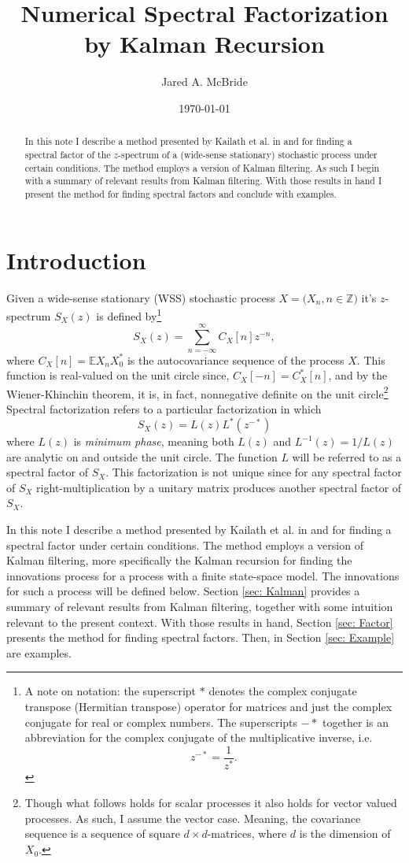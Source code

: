 \documentclass[12pt]{amsart}
\title{Numerical Spectral Factorization by Kalman Recursion}
\author{Jared A. McBride}
\date{\today}
\newcommand{\E}{\mathbb{E}}
\newcommand{\Z}{\mathbb{Z}}
\begin{document}
	
\begin{abstract}
	In this note I describe a method presented by Kailath et al. in \cite{sayed2001} and \cite{kailath2000} for finding a spectral factor of the $z$-spectrum of a (wide-sense stationary) stochastic process under certain conditions. The method employs a version of Kalman filtering. As such I begin with a summary of relevant results from Kalman filtering. With those results in hand I present the method for finding spectral factors and conclude with examples.
\end{abstract}

\maketitle
\tableofcontents

\section{Introduction}

Given a wide-sense stationary (WSS) stochastic process $X = \big(X_n, n \in \Z\big)$ it's $z$-spectrum $S_X(z)$ is defined by\footnote{
	A note on notation: the superscript $*$ denotes the complex conjugate transpose (Hermitian transpose) operator for matrices and just the complex conjugate for real or complex numbers. The superscripts $-*$ together is an abbreviation for the complex conjugate of the multiplicative inverse, i.e. $$z^{-*} = \frac{1}{z^*}.$$
	} 
$$S_X(z) = \sum_{n=-\infty}^\infty C_X[n]z^{-n},$$
where $C_X[n] = \E X_nX_0^*$ is the autocovariance sequence of the process $X$. This function is real-valued on the unit circle since, $C_X[-n] = C_X^*[n]$, and by the Wiener-Khinchin theorem, it is, in fact, nonnegative definite on the unit circle\footnote{
	Though what follows holds for scalar processes it also holds for vector valued processes. As such, I assume the vector case. Meaning, the covariance sequence is a sequence of square $d\times d$-matrices, where $d$ is the dimension of $X_0$.}
Spectral factorization refers to a particular factorization in which 
$$S_X(z) = L(z)L^*(z^{-*})$$
where $L(z)$ is \emph{minimum phase}, meaning both $L(z)$ and $L^{-1}(z) = 1/L(z)$ are analytic on and outside the unit circle. The function $L$ will be referred to as a spectral factor of $S_X$. This factorization is not unique since for any spectral factor of $S_X$ right-multiplication by a unitary matrix produces another spectral factor of $S_X$. 

In this note I describe a method presented by Kailath et al. in \cite{sayed2001} and \cite[p.~336]{kailath2000} for finding a spectral factor under certain conditions. The method employs a version of Kalman filtering, more specifically the Kalman recursion for finding the innovations process for a process with a finite state-space model. The innovations for such a process will be defined below. Section \ref{sec: Kalman} provides a summary of relevant results from Kalman filtering, together with some intuition relevant to the present context. With those results in hand, Section \ref{sec: Factor} presents the method for finding spectral factors. Then, in Section \ref{sec: Example} are examples.  
\end{document}

